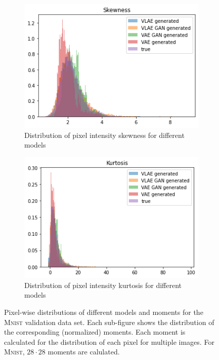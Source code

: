 \begin{figure}
    \hfill
    \begin{subfigure}{0.48\textwidth}
        \centering
        \includegraphics[width=\textwidth]{images/generated_vs_true/mnist/mnist_vs_models_skew.png}
        \caption{Distribution of pixel intensity skewness for different models}
        \label{subfig:skew_generated_vs_true}
    \end{subfigure}
    \hfill
    \begin{subfigure}{0.48\textwidth}
        \centering
        \includegraphics[width=\textwidth]{images/generated_vs_true/mnist/mnist_vs_models_kurt.png}
        \caption{Distribution of pixel intensity kurtosis for different models}
        \label{subfig:kurt_generated_vs_true}
    \end{subfigure}
    \caption[Models on \textsc{Mnist}: Pixel-wise distributions]{Pixel-wise distributions of different models and moments for the \textsc{Mnist} validation data set.
    Each sub-figure shows the distribution of the corresponding (normalized) moments. Each moment is calculated for the distribution of each pixel for multiple images.
    For \textsc{Mnist}, $28\cdot 28$ moments are calulated.}
    \label{fig:mean_generated_vs_true}
\end{figure}

